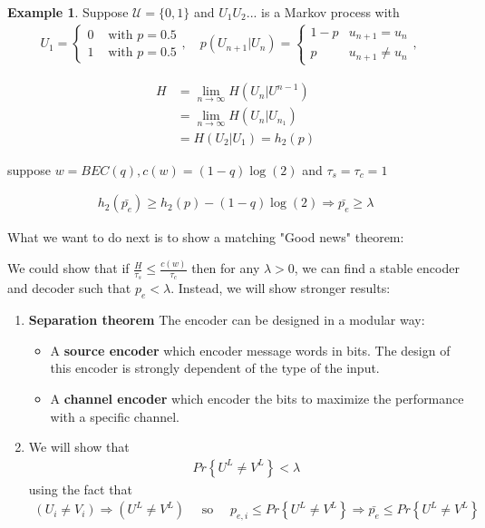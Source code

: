 \documentclass[twoside]{article}
\theoremstyle{definition} %
\newtheorem{example}{Example}
\renewcommand{\Pr}[1]{Pr\left\{#1\right\}}
\def\U{\mathcal{U}}
\begin{document}
\begin{example}
  Suppose $\U = \{ 0, 1 \}$ and $U_1 U_2 ...$ is a Markov process with
    \begin{align*}
    U_1 =
    \left\{
    \begin{array}{ll}
      0 & \text{ with } p = 0.5 \\
      1 & \text{ with } p = 0.5
    \end{array}
    \right. , \quad
    p(U_{n+1} | U_n) =
    \left\{
    \begin{array}{ll}
      1 - p & u_{n+1} = u_n \\
      p     & u_{n+1} \neq u_n
    \end{array}
    \right. , \quad
  \end{align*}
\end{example}

\begin{align*}
  H &= \lim_{n \to \infty} H(U_n | U^{n-1})\\
    &= \lim_{n \to \infty} H(U_n | U_{n_1})\\
    &= H(U_2 | U_1) = h_2(p)
\end{align*}

suppose $w = BEC(q), c(w) = (1 - q)\log(2)$ and $\tau_s = \tau_c = 1$

\begin{align*}
  h_2(\bar{p_e}) \geq h_2(p) - (1 - q)\log(2) \Rightarrow \bar{p_e} \geq \lambda
\end{align*}

What we want to do next is to show a matching "Good news" theorem:

We could show that if $\frac{H}{\tau_s} \leq \frac{c(w)}{\tau_c}$ then for any $\lambda > 0$, we can find a stable encoder and decoder such that $p_e < \lambda$.
Instead, we will show stronger results:
\begin{enumerate}
  \item \textbf{Separation theorem}
    The encoder can be designed in a modular way:
    \begin{itemize}
      \item A \textbf{source encoder} which encoder message words in bits. The design of this encoder is strongly dependent of the type of the input.
      \item A \textbf{channel encoder} which encoder the bits to maximize the performance with a specific channel.
    \end{itemize}
  \item We will show that
  \begin{align*}
    \Pr{U^L \neq V^L} < \lambda
  \end{align*}
  using the fact that
  \begin{align*}
    (U_i \neq V_i) \Rightarrow (U^L \neq V^L)
    \quad \text{ so } \quad
    p_{e,i} \leq \Pr{U^L \neq V^L} \Rightarrow \bar{p_e} \leq \Pr{U^L \neq V^L}
  \end{align*}
\end{enumerate}
\end{document}
